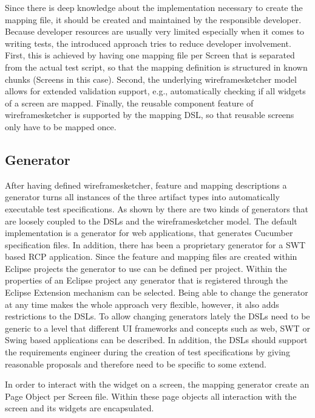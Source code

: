 \documentclass{sig-alternate-05-2015}
\begin{document}
Since there is deep knowledge about the implementation necessary to create the mapping file, it should be created and maintained by the responsible developer. 
Because developer resources are usually very limited especially when it comes to writing tests, the introduced approach tries to reduce developer involvement.
First, this is achieved by having one mapping file per Screen that is separated from the actual test script, so that the mapping definition is structured in known chunks (Screens in this case). 
Second, the underlying wireframesketcher model allows for extended validation support, e.g., automatically checking if all widgets of a screen are mapped.
Finally, the reusable component feature of wireframesketcher is supported by the mapping DSL, so that reusable screens only have to be mapped once.

\subsection{Generator}\label{sec:Generator} 
After having defined wireframesketcher, feature and mapping descriptions a generator turns all instances of the three artifact types into automatically executable test specifications.
As shown by  there are two kinds of generators that are loosely coupled to the DSLs and the wireframesketcher model.
The default implementation is a generator for web applications, that generates Cucumber specification files.
In addition, there has been a proprietary generator for a SWT based RCP application.
Since the feature and mapping files are created within Eclipse projects the generator to use can be defined per project.
Within the properties of an Eclipse project any generator that is registered through the Eclipse Extension mechanism can be selected.
Being able to change the generator at any time makes the whole approach very flexible, however, it also adds restrictions to the DSLs.
To allow changing generators lately the DSLs need to be generic to a level that different UI frameworks and concepts such as web, SWT or Swing based applications can be described.
In addition, the DSLs should support the requirements engineer during the creation of test specifications by giving reasonable proposals and therefore need to be specific to some extend.

In order to interact with the widget on a screen, the mapping generator create an Page Object \cite{fowler.2013} per Screen file.
Within these page objects all interaction with the screen and its widgets are encapsulated.
\end{document}
